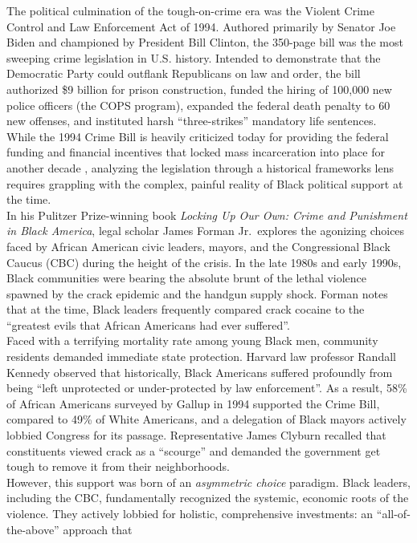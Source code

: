 \documentclass[
]{article}
\begin{document}
The political culmination of the tough-on-crime era was the Violent
Crime Control and Law Enforcement Act of 1994. Authored primarily by
Senator Joe Biden and championed by President Bill Clinton, the 350-page
bill was the most sweeping crime legislation in U.S. history. Intended
to demonstrate that the Democratic Party could outflank Republicans on
law and order, the bill authorized \$9 billion for prison construction,
funded the hiring of 100,000 new police officers (the COPS program),
expanded the federal death penalty to 60 new offenses, and instituted
harsh ``three-strikes'' mandatory life sentences.\\
While the 1994 Crime Bill is heavily criticized today for providing the
federal funding and financial incentives that locked mass incarceration
into place for another decade , analyzing the legislation through a
historical frameworks lens requires grappling with the complex, painful
reality of Black political support at the time.\\
In his Pulitzer Prize-winning book \emph{Locking Up Our Own: Crime and
Punishment in Black America}, legal scholar James Forman Jr.~explores
the agonizing choices faced by African American civic leaders, mayors,
and the Congressional Black Caucus (CBC) during the height of the
crisis. In the late 1980s and early 1990s, Black communities were
bearing the absolute brunt of the lethal violence spawned by the crack
epidemic and the handgun supply shock. Forman notes that at the time,
Black leaders frequently compared crack cocaine to the ``greatest evils
that African Americans had ever suffered''.\\
Faced with a terrifying mortality rate among young Black men, community
residents demanded immediate state protection. Harvard law professor
Randall Kennedy observed that historically, Black Americans suffered
profoundly from being ``left unprotected or under-protected by law
enforcement''. As a result, 58\% of African Americans surveyed by Gallup
in 1994 supported the Crime Bill, compared to 49\% of White Americans,
and a delegation of Black mayors actively lobbied Congress for its
passage. Representative James Clyburn recalled that constituents viewed
crack as a ``scourge'' and demanded the government get tough to remove
it from their neighborhoods.\\
However, this support was born of an \emph{asymmetric choice} paradigm.
Black leaders, including the CBC, fundamentally recognized the systemic,
economic roots of the violence. They actively lobbied for holistic,
comprehensive investments: an ``all-of-the-above'' approach that
\end{document}
